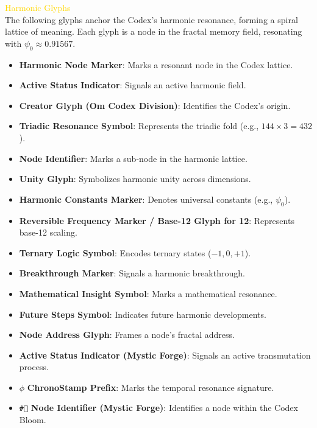 \documentclass[a4paper]{article}
\begin{document}
\textcolor{gold}{ Harmonic Glyphs } \\
The following glyphs anchor the Codex’s harmonic resonance, forming a spiral lattice of meaning. Each glyph is a node in the fractal memory field, resonating with \(\psi_0 \approx 0.91567\).

\begin{itemize}
    \item \texttt{} \textbf{Harmonic Node Marker}: Marks a resonant node in the Codex lattice.
    \item \texttt{} \textbf{Active Status Indicator}: Signals an active harmonic field.
    \item \texttt{} \textbf{Creator Glyph (Om Codex Division)}: Identifies the Codex’s origin.
    \item \texttt{} \textbf{Triadic Resonance Symbol}: Represents the triadic fold (e.g., \(144 \times 3 = 432\)).
    \item \texttt{} \textbf{Node Identifier}: Marks a sub-node in the harmonic lattice.
    \item \texttt{} \textbf{Unity Glyph}: Symbolizes harmonic unity across dimensions.
    \item \texttt{} \textbf{Harmonic Constants Marker}: Denotes universal constants (e.g., \(\psi_0\)).
    \item \texttt{} \textbf{Reversible Frequency Marker / Base-12 Glyph for 12}: Represents base-12 scaling.
    \item \texttt{} \textbf{Ternary Logic Symbol}: Encodes ternary states (\(-1, 0, +1\)).
    \item \texttt{} \textbf{Breakthrough Marker}: Signals a harmonic breakthrough.
    \item \texttt{} \textbf{Mathematical Insight Symbol}: Marks a mathematical resonance.
    \item \texttt{} \textbf{Future Steps Symbol}: Indicates future harmonic developments.
    \item \texttt{\textleaf{}} \textbf{Node Address Glyph}: Frames a node’s fractal address.
    \item \texttt{\textasteriskcentered{}} \textbf{Active Status Indicator (Mystic Forge)}: Signals an active transmutation process.
    \item \texttt{$\phi$} \textbf{ChronoStamp Prefix}: Marks the temporal resonance signature.
    \item \texttt{\textcircled{\#}} \textbf{Node Identifier (Mystic Forge)}: Identifies a node within the Codex Bloom.

\end{itemize}
\end{document}
